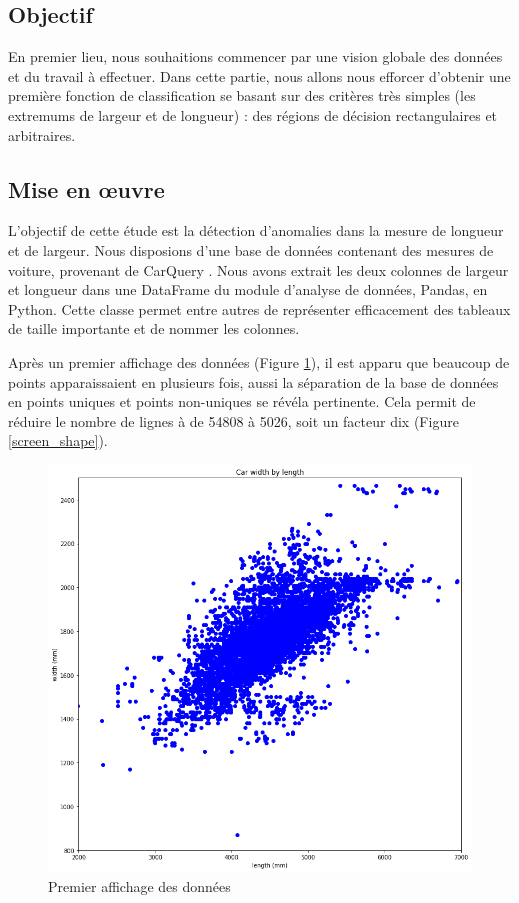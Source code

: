 \documentclass[a4paper]{report}
\begin{document}
\subsection{Objectif}

En premier lieu, nous souhaitions commencer par une vision globale des données et du travail à effectuer. Dans cette partie, nous allons nous efforcer d'obtenir une première fonction de classification se basant sur des critères très simples (les extremums de largeur et de longueur) : des régions de décision rectangulaires et arbitraires.

\subsection{Mise en {\oe}uvre}

L'objectif de cette étude est la détection d'anomalies dans la mesure de longueur et de largeur. Nous disposions d'une base de données contenant des mesures de voiture, provenant de CarQuery \cite{carquery}. Nous avons extrait les deux colonnes de largeur et longueur dans une DataFrame du module d'analyse de données, Pandas, en Python. Cette classe permet entre autres de représenter efficacement des tableaux de taille importante et de nommer les colonnes.

Après un premier affichage des données (Figure \ref{first_plot}), il est apparu que beaucoup de points apparaissaient en plusieurs fois, aussi la séparation de la base de données en points uniques et points non-uniques se révéla pertinente. Cela permit de réduire le nombre de lignes à de 54808 à 5026, soit un facteur dix (Figure \ref{screen_shape}).

\begin{figure}
\centering
\includegraphics[width=\textwidth]{img/first_plot.png}
\caption{Premier affichage des données\label{first_plot}}
\end{figure}
\end{document}
